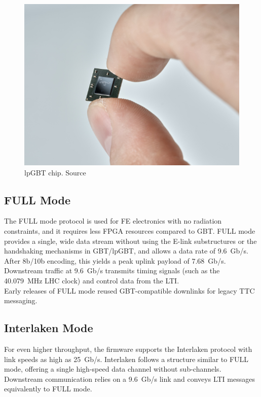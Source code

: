 \begin{figure}[H]
\centering
\includegraphics[width=\textwidth]{images/felix/lpgbt.jpg}
\caption[lpGBT chip]{\acs{lpGBT} chip. Source \protect\cite{lpgbt-image-source}}
\label{fig:lpgbt}
\end{figure}

\subsection{FULL Mode}
\label{subsec:felix-fullmode}

The FULL mode protocol \cite{fullmode} is used for \acl{FE} electronics with no radiation constraints, and it requires less \acs{FPGA} resources compared to \acs{GBT}. FULL mode provides a single, wide data stream without using the \acs{E-link} substructures or the handshaking mechanisms in \acs{GBT}/\acs{lpGBT}, and allows a data rate of 9.6~Gb/s. After 8b/10b encoding, this yields a peak uplink payload of 7.68~Gb/s.\\
Downstream traffic at 9.6~Gb/s transmits timing signals (such as the 40.079~MHz \acs{LHC} clock) and control data from the \acf{LTI}.\\
Early releases of FULL mode reused GBT-compatible downlinks for legacy \acf{TTC} messaging.

\subsection{Interlaken Mode}
\label{subsec:felix-interlaken}

For even higher throughput, the firmware supports the Interlaken protocol \cite{InterlakenSpec} with link speeds as high as 25~Gb/s. Interlaken follows a structure similar to FULL mode, offering a single high-speed data channel without sub-channels. Downstream communication relies on a 9.6~Gb/s link and conveys \acs{LTI} messages equivalently to FULL mode.

